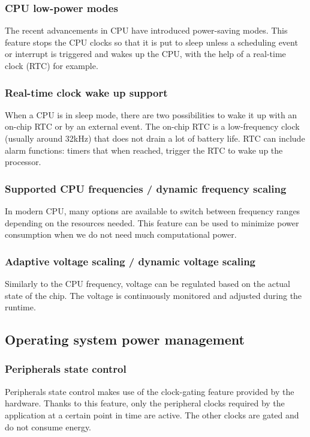 \subsubsection{CPU low-power modes}
The recent advancements in CPU have introduced power-saving modes.
This feature stops the CPU clocks so that it is put to sleep unless
    a scheduling event or interrupt is triggered and wakes up the CPU, with the help of a real-time clock (RTC) for example.

\subsubsection{Real-time clock wake up support}
When a CPU is in sleep mode, there are two possibilities to wake it up with an on-chip RTC or by an external event.
The on-chip RTC is a low-frequency clock (usually around 32kHz) that does not drain a lot of battery life.
RTC can include alarm functions: timers that when reached, trigger the RTC to wake up the processor.

\subsubsection{Supported CPU frequencies / dynamic frequency scaling}
In modern CPU, many options are available to switch between frequency ranges depending on the resources needed.
This feature can be used to minimize power consumption when  we do not need much computational power.

\subsubsection{Adaptive voltage scaling / dynamic voltage scaling}
Similarly to the CPU frequency, voltage can be regulated based on the actual state of the chip.
The voltage is continuously monitored and adjusted during the runtime.


\subsection{Operating system power management}

\subsubsection{Peripherals state control}
Peripherals state control makes use of the clock-gating feature provided by the hardware.
Thanks to this feature, only the peripheral clocks required by the application at a certain point in time are active.
The other clocks are gated and do not consume energy.

